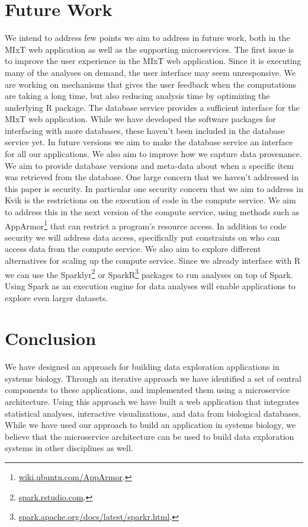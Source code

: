 \section{Future Work} 
We intend to address few points we aim to address in future work, both in the
MIxT web application as well as the supporting microservices.  The first issue
is to improve the user experience in the MIxT web application.  Since it is
executing many of the analyses on demand, the user interface may seem
unresponsive. We are working on mechanisms that gives the user feedback when the
computations are taking a long time, but also reducing analysis time by
optimizing the underlying R package.  The database service provides a sufficient
interface for the MIxT web application. While we have developed the software
packages for interfacing with more databases, these haven't been included in the
database service yet. In future versions we aim to make the database service an
interface for all our applications.  We also aim to improve how we capture data
provenance. We aim to provide database versions and meta-data about when a
specific item was retrieved from the database.  One large concern that we
haven't addressed in this paper is security. In particular one security concern
that we aim to address in Kvik is the restrictions on the execution of code in
the compute service. We aim to address this in the next version of the compute
service, using methods such as
AppArmor\footnote{\url{wiki.ubuntu.com/AppArmor}.} that can restrict a program's
resource access. In addition to code security we will address data access,
specifically put constraints on who can access data from the compute service.
We also aim to explore different alternatives for scaling up the compute
service.  Since we already interface with R we can use the
Sparklyr\footnote{\url{spark.rstudio.com}.} or
SparkR\footnote{\url{spark.apache.org/docs/latest/sparkr.html}.} packages to run
analyses on top of Spark.\cite{zaharia2010spark} Using Spark as an execution
engine for data analyses will enable applications to explore even larger
datasets.

\section{Conclusion}
We have designed an approach for building data exploration applications in
systems biology. Through an iterative approach we have identified a set of
central components to these applications, and implemented them using a
microservice architecture. Using this approach we have built a web application
that integrates statistical analyses, interactive visualizations, and data from
biological databases. While we have used our approach to build an application in
systems biology, we believe that the microservice architecture can be used to
build data exploration systems in other disciplines as well. 


